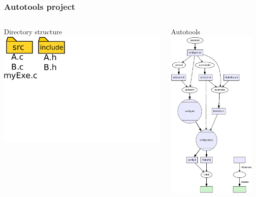 \documentclass{beamer}
\begin{document}
\begin{frame}[fragile] \frametitle{Autotools project}
  \begin{columns}
    \begin{column}{0.5\textwidth}
      \begin{block}{Directory  structure}
        \includegraphics[width=\textwidth]{dir_cmake_base}
      \end{block}
    \end{column}
    \begin{column}{0.5\textwidth}
      \begin{block}{Autotools}
        \includegraphics[width=.65\textwidth]{autotools}
      \end{block}
    \end{column}
  \end{columns}
\end{frame}
\end{document}
